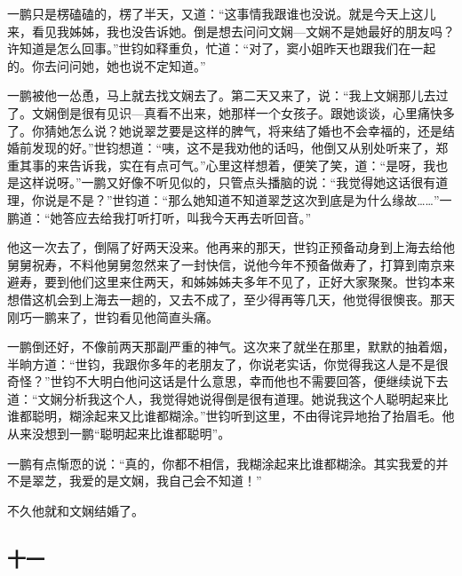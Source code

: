 \par 一鹏只是楞磕磕的，楞了半天，又道：“这事情我跟谁也没说。就是今天上这儿来，看见我姊姊，我也没告诉她。倒是想去问问文娴—文娴不是她最好的朋友吗？许知道是怎么回事。”世钧如释重负，忙道：“对了，窦小姐昨天也跟我们在一起的。你去问问她，她也说不定知道。”
\par 一鹏被他一怂恿，马上就去找文娴去了。第二天又来了，说：“我上文娴那儿去过了。文娴倒是很有见识—真看不出来，她那样一个女孩子。跟她谈谈，心里痛快多了。你猜她怎么说？她说翠芝要是这样的脾气，将来结了婚也不会幸福的，还是结婚前发现的好。”世钧想道：“咦，这不是我劝他的话吗，他倒又从别处听来了，郑重其事的来告诉我，实在有点可气。”心里这样想着，便笑了笑，道：“是呀，我也是这样说呀。”一鹏又好像不听见似的，只管点头播脑的说：“我觉得她这话很有道理，你说是不是？”世钧道：“那么她知道不知道翠芝这次到底是为什么缘故……”一鹏道：“她答应去给我打听打听，叫我今天再去听回音。”
\par 他这一次去了，倒隔了好两天没来。他再来的那天，世钧正预备动身到上海去给他舅舅祝寿，不料他舅舅忽然来了一封快信，说他今年不预备做寿了，打算到南京来避寿，要到他们这里来住两天，和姊姊姊夫多年不见了，正好大家聚聚。世钧本来想借这机会到上海去一趟的，又去不成了，至少得再等几天，他觉得很懊丧。那天刚巧一鹏来了，世钧看见他简直头痛。
\par 一鹏倒还好，不像前两天那副严重的神气。这次来了就坐在那里，默默的抽着烟，半晌方道：“世钧，我跟你多年的老朋友了，你说老实话，你觉得我这人是不是很奇怪？”世钧不大明白他问这话是什么意思，幸而他也不需要回答，便继续说下去道：“文娴分析我这个人，我觉得她说得倒是很有道理。她说我这个人聪明起来比谁都聪明，糊涂起来又比谁都糊涂。”世钧听到这里，不由得诧异地抬了抬眉毛。他从来没想到一鹏“聪明起来比谁都聪明”。
\par 一鹏有点惭恧的说：“真的，你都不相信，我糊涂起来比谁都糊涂。其实我爱的并不是翠芝，我爱的是文娴，我自己会不知道！”
\par 不久他就和文娴结婚了。


\subsection{十一}

